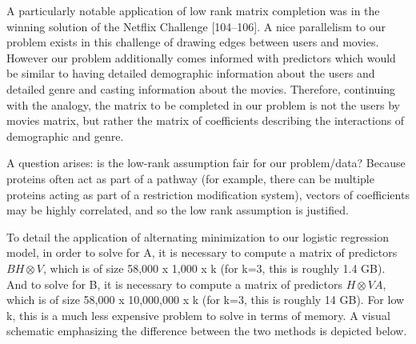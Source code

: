 \documentclass[12pt,twoside]{mitthesis-manusdown}
\begin{document}
A particularly notable application of low rank matrix completion was in
the winning solution of the Netflix Challenge {[}104--106{]}. A nice
parallelism to our problem exists in this challenge of drawing edges
between users and movies. However our problem additionally comes
informed with predictors which would be similar to having detailed
demographic information about the users and detailed genre and casting
information about the movies. Therefore, continuing with the analogy,
the matrix to be completed in our problem is not the users by movies
matrix, but rather the matrix of coefficients describing the
interactions of demographic and genre.

A question arises: is the low-rank assumption fair for our problem/data?
Because proteins often act as part of a pathway (for example, there can
be multiple proteins acting as part of a restriction modification
system), vectors of coefficients may be highly correlated, and so the
low rank assumption is justified.

To detail the application of alternating minimization to our logistic
regression model, in order to solve for A, it is necessary to compute a
matrix of predictors \(BH \otimes V\), which is of size 58,000 x 1,000 x
k (for k=3, this is roughly 1.4 GB). And to solve for B, it is necessary
to compute a matrix of predictors \(H \otimes VA\), which is of size
58,000 x 10,000,000 x k (for k=3, this is roughly 14 GB). For low k,
this is a much less expensive problem to solve in terms of memory. A
visual schematic emphasizing the difference between the two methods is
depicted below.
\end{document}
